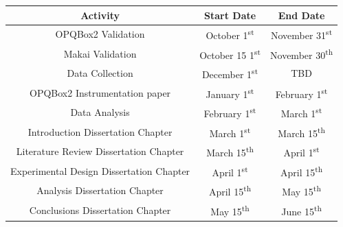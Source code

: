 \begin{center}
\begin{tabular}{ ||c | c c|| }
\hline
 \textbf{Activity} & \textbf{Start Date} & \textbf{End Date} \\ 
 \hline
 \hline
 OPQBox2 Validation & October 1\textsuperscript{st} & November 31\textsuperscript{st} \\  
 Makai Validation & October 15 1\textsuperscript{st} & November 30\textsuperscript{th}   \\
 Data Collection & December 1\textsuperscript{st} & TBD   \\
 OPQBox2 Instrumentation paper & January 1\textsuperscript{st} & February 1\textsuperscript{st}   \\
 Data Analysis & February 1\textsuperscript{st} & March 1\textsuperscript{st}  \\
 Introduction Dissertation Chapter & March 1\textsuperscript{st}  & March 15\textsuperscript{th}  \\
 Literature Review Dissertation Chapter & March 15\textsuperscript{th} & April 1\textsuperscript{st}  \\
 Experimental Design Dissertation Chapter & April 1\textsuperscript{st} & April 15\textsuperscript{th}  \\
 Analysis Dissertation Chapter & April 15\textsuperscript{th} & May 15\textsuperscript{th}  \\
 Conclusions Dissertation Chapter & May 15\textsuperscript{th} & June 15\textsuperscript{th}  \\
 \hline
 
\end{tabular}
\end{center}
